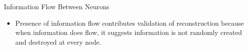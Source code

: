 \documentclass{beamer}
\begin{document}
\begin{frame}{Information Flow Between Neurons}
\begin{itemize}






\vfill \item Presence of information flow contributes  validation of reconstruction because when information does flow, it suggests information is not randomly created and destroyed at every node.


\end{itemize}

\end{frame}
\end{document}
